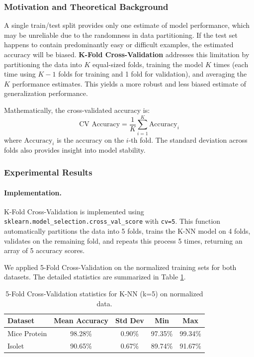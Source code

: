 \documentclass[12pt]{article}
\begin{document}
\subsubsection{Motivation and Theoretical Background}
A single train/test split provides only one estimate of model performance, which may be unreliable due to the randomness in data partitioning. If the test set happens to contain predominantly easy or difficult examples, the estimated accuracy will be biased. \textbf{K-Fold Cross-Validation} addresses this limitation by partitioning the data into $K$ equal-sized folds, training the model $K$ times (each time using $K-1$ folds for training and 1 fold for validation), and averaging the $K$ performance estimates. This yields a more robust and less biased estimate of generalization performance.

Mathematically, the cross-validated accuracy is:
\begin{equation}
    \text{CV Accuracy} = \frac{1}{K} \sum_{i=1}^{K} \text{Accuracy}_i
\end{equation}
where $\text{Accuracy}_i$ is the accuracy on the $i$-th fold. The standard deviation across folds also provides insight into model stability.

\subsubsection{Experimental Results}

\paragraph{Implementation.} K-Fold Cross-Validation is implemented using \texttt{sklearn.model\_selection.cross\_val\_score} with \texttt{cv=5}. This function automatically partitions the data into 5 folds, trains the K-NN model on 4 folds, validates on the remaining fold, and repeats this process 5 times, returning an array of 5 accuracy scores.

We applied 5-Fold Cross-Validation on the normalized training sets for both datasets. The detailed statistics are summarized in Table \ref{tab:cv_results}.

\begin{table}[H]
\centering
\begin{tabular}{lcccc}
\toprule
\textbf{Dataset} & \textbf{Mean Accuracy} & \textbf{Std Dev} & \textbf{Min} & \textbf{Max} \\
\midrule
Mice Protein & 98.28\% & 0.90\% & 97.35\% & 99.34\% \\
Isolet & 90.65\% & 0.67\% & 89.74\% & 91.67\% \\
\bottomrule
\end{tabular}
\caption{5-Fold Cross-Validation statistics for K-NN (k=5) on normalized data.}
\label{tab:cv_results}
\end{table}
\end{document}
